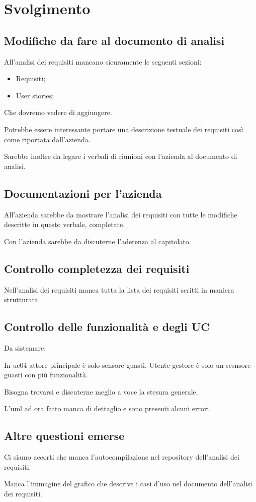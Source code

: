 \section{Svolgimento}

\subsection{Modifiche da fare al documento di analisi}

All'analisi dei requisiti mancano sicuramente le seguenti sezioni:
\begin{itemize}
    \item Requisiti;
    \item User stories;
\end{itemize}
Che dovremo vedere di aggiungere.

Potrebbe essere interessante portare una descrizione testuale dei requisiti così come riportata dall'azienda.

Sarebbe inoltre da legare i verbali di riunioni con l'azienda al documento di analisi.

\subsection{Documentazioni per l'azienda}

All'azienda sarebbe da mostrare l'analisi dei requisiti con tutte le modifiche descritte in questo verbale, completate.

Con l'azienda sarebbe da discuterne l'aderenza al capitolato.

\subsection{Controllo completezza dei requisiti}

Nell'analisi dei requisiti manca tutta la lista dei requisiti scritti in maniera strutturata

\subsection{Controllo delle funzionalità e degli UC}

Da sistemare: 

In uc04 attore principale è solo sensore guasti. Utente gestore è solo un sesnsore guasti con più funzionalità.

Bisogna trovarsi e discuterne meglio a voce la stesura generale.

L'uml ad ora fatto manca di dettaglio e sono presenti alcuni errori.

\subsection{Altre questioni emerse}

Ci siamo accorti che manca l'autocompilazione nel repository dell'analisi dei requisiti.

Manca l'immagine del grafico che descrive i casi d'uso nel documento dell'analisi dei requisiti.
